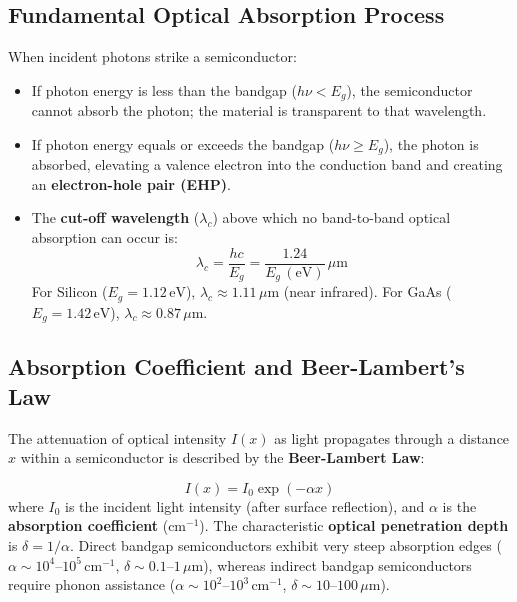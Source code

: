 \documentclass[12pt,a4paper]{article}
\begin{document}
\subsection{Fundamental Optical Absorption Process}
When incident photons strike a semiconductor:
\begin{itemize}[leftmargin=*, itemsep=3pt]
  \item If photon energy is less than the bandgap ($h\nu < E_g$), the semiconductor cannot absorb the photon; the material is transparent to that wavelength.
  \item If photon energy equals or exceeds the bandgap ($h\nu \ge E_g$), the photon is absorbed, elevating a valence electron into the conduction band and creating an \textbf{electron-hole pair (EHP)}.
  \item The \textbf{cut-off wavelength} ($\lambda_c$) above which no band-to-band optical absorption can occur is:
  \begin{equation}
    \lambda_c = \frac{hc}{E_g} = \frac{1.24}{E_g\,(\text{eV})}\,\mu\text{m}
  \end{equation}
  For Silicon ($E_g = 1.12\,\text{eV}$), $\lambda_c \approx 1.11\,\mu\text{m}$ (near infrared). For GaAs ($E_g = 1.42\,\text{eV}$), $\lambda_c \approx 0.87\,\mu\text{m}$.
\end{itemize}

\subsection{Absorption Coefficient and Beer-Lambert's Law}
The attenuation of optical intensity $I(x)$ as light propagates through a distance $x$ within a semiconductor is described by the \textbf{Beer-Lambert Law}:

\begin{tcolorbox}[formulabox, title={\textbf{Beer-Lambert Absorption Law}}]
\begin{equation}
  I(x) = I_0 \exp(-\alpha x)
\end{equation}
where $I_0$ is the incident light intensity (after surface reflection), and $\alpha$ is the \textbf{absorption coefficient} ($\text{cm}^{-1}$). The characteristic \textbf{optical penetration depth} is $\delta = 1/\alpha$. Direct bandgap semiconductors exhibit very steep absorption edges ($\alpha \sim 10^4\text{--}10^5\,\text{cm}^{-1}$, $\delta \sim 0.1\text{--}1\,\mu\text{m}$), whereas indirect bandgap semiconductors require phonon assistance ($\alpha \sim 10^2\text{--}10^3\,\text{cm}^{-1}$, $\delta \sim 10\text{--}100\,\mu\text{m}$).
\end{tcolorbox}
\end{document}
